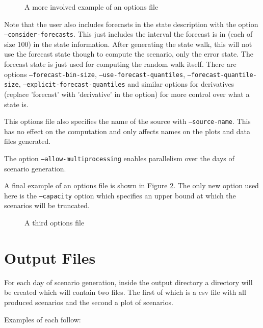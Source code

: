 \documentclass[11pt]{article}
\begin{document}
	\begin{figure}[H]
	\begin{framed}
		
	\end{framed}
	\caption{A more involved example of an options file}
	\label{example2}
	\end{figure}
	
	Note that the user also includes forecasts in the state description with
	the option \texttt{--consider-forecasts}. This just includes the interval
	the forecast is in (each of size 100) in the state information. After
	generating the state walk, this will not use the forecast state though
	to compute the scenario, only the error state. The forecast state is just
	used for computing the random walk itself. There are options
	\texttt{--forecast-bin-size}, \texttt{--use-forecast-quantiles},
	\texttt{--forecast-quantile-size}, \texttt{--explicit-forecast-quantiles}
	and similar options for derivatives (replace 'forecast' with 'derivative' in the option) for more control over what a state is.
	
	This options file also specifies the name of the source with \texttt{--source-name}. This has no effect on the computation and only affects names on
	the plots and data files generated.
	
	The option \texttt{--allow-multiprocessing} enables parallelism over the
	days of scenario generation.
	
	A final example of an options file is shown in Figure \ref{example3}. The
	only new option used here is the \texttt{--capacity} option which specifies
	an upper bound at which the scenarios will be truncated.
	
	\begin{figure}[H]
	\begin{framed}
		
	\end{framed}
	\caption{A third options file}
	\label{example3}
	\end{figure}
	
	\section{Output Files}
	For each day of scenario generation, inside the output directory a 
	directory will be created which will
	contain two files. The first of which is a csv file with all produced
	scenarios and the second a plot of scenarios.
	
	Examples of each follow:
	
\end{document}
